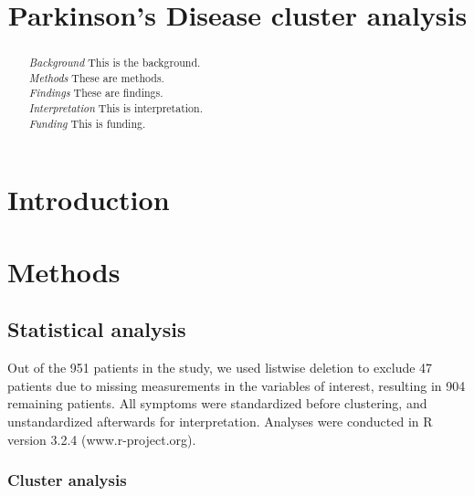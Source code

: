 \documentclass[preprint,5p]{elsarticle} %
\begin{document}
\begin{frontmatter}
\title{Parkinson's Disease cluster analysis}

\begin{abstract}
\emph{Background} \quad This is the background. \\
\emph{Methods} \quad  These are methods. \\
\emph{Findings} \quad These are findings. \\
\emph{Interpretation} \quad This is interpretation. \\
\emph{Funding} \quad This is funding.
\end{abstract}
\end{frontmatter}


\section{Introduction}

\section{Methods}

\subsection{Statistical analysis}

Out of the 951 patients in the study, we used listwise deletion to exclude 47 patients due to
missing measurements in the variables of interest, resulting in 904 remaining patients. All
symptoms were standardized before clustering, and unstandardized afterwards for interpretation.
Analyses were conducted in R version 3.2.4 (www.r-project.org).

\subsubsection{Cluster analysis}
\end{document}
